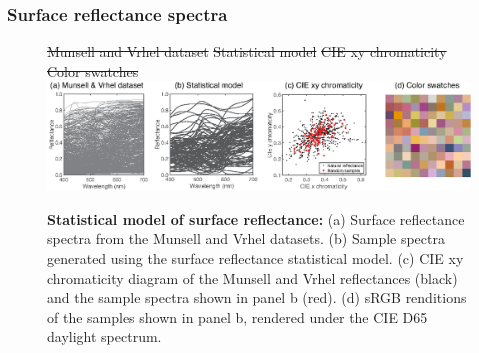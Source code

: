 \documentclass{jov}
\providecommand{\DIFdeltex}[1]{{\protect\color{red}\sout{#1}}}                      %
\providecommand{\DIFdelFL}[1]{\DIFdel{#1}} %
\providecommand{\DIFaddbeginFL}{} %
\providecommand{\DIFaddendFL}{} %
\providecommand{\DIFdelbeginFL}{} %
\providecommand{\DIFdelendFL}{} %
\providecommand{\DIFdel}[1]{\texorpdfstring{\DIFdeltex{#1}}{}} %
\newcommand{\DIFscaledelfig}{0.5}
\newlength{\DIFdelgraphicswidth} %
\newlength{\DIFdelgraphicsheight} %
\newcommand{\DIFaddincludegraphics}[2][]{{\color{blue}\fbox{\DIFOincludegraphics[#1]{#2}}}} %
\newcommand{\DIFdelincludegraphics}[2][]{%
\sbox{\DIFdelgraphicsbox}{\DIFOincludegraphics[#1]{#2}}%
\settoboxwidth{\DIFdelgraphicswidth}{\DIFdelgraphicsbox} %
\settoboxtotalheight{\DIFdelgraphicsheight}{\DIFdelgraphicsbox} %
\scalebox{\DIFscaledelfig}{%
\parbox[b]{\DIFdelgraphicswidth}{\usebox{\DIFdelgraphicsbox}\\[-\baselineskip] \rule{\DIFdelgraphicswidth}{0em}}\llap{\resizebox{\DIFdelgraphicswidth}{\DIFdelgraphicsheight}{%
\setlength{\unitlength}{\DIFdelgraphicswidth}%
\begin{picture}(1,1)%
\thicklines\linethickness{2pt} %
{\color[rgb]{1,0,0}\put(0,0){\framebox(1,1){}}}%
{\color[rgb]{1,0,0}\put(0,0){\line( 1,1){1}}}%
{\color[rgb]{1,0,0}\put(0,1){\line(1,-1){1}}}%
\end{picture}%
}\hspace*{3pt}}} %
} %
\DeclareRobustCommand{\DIFaddbeginFL}{\DIFOaddbeginFL \let\includegraphics\DIFaddincludegraphics} %
\DeclareRobustCommand{\DIFaddendFL}{\DIFOaddendFL \let\includegraphics\DIFOincludegraphics} %
\DeclareRobustCommand{\DIFdelbeginFL}{\DIFOdelbeginFL \let\includegraphics\DIFdelincludegraphics} %
\DeclareRobustCommand{\DIFdelendFL}{\DIFOaddendFL \let\includegraphics\DIFOincludegraphics} %
\begin{document}
\subsubsection{Surface reflectance spectra}
\begin{figure}
\centering
    \DIFdelbeginFL %
{%
\DIFdelFL{Munsell and Vrhel dataset}}
{%
\DIFdelFL{Statistical model}}
{%
\DIFdelFL{CIE xy chromaticity}}
{%
\DIFdelFL{Color swatches}}
\DIFdelendFL \DIFaddbeginFL \includegraphics{Figure7.eps}
    \DIFaddendFL \caption{{\bf Statistical model of surface reflectance:} (a) Surface reflectance spectra from the Munsell and Vrhel datasets. (b) Sample spectra generated using the surface reflectance statistical model. (c) CIE xy chromaticity diagram of the Munsell and Vrhel reflectances (black) and the sample spectra shown in panel b (red). (d) sRGB renditions of the samples shown in panel b, rendered under the CIE D65 daylight spectrum.}
\label{fig:surfaceReflectanceGeneration}
\end{figure}
\end{document}
